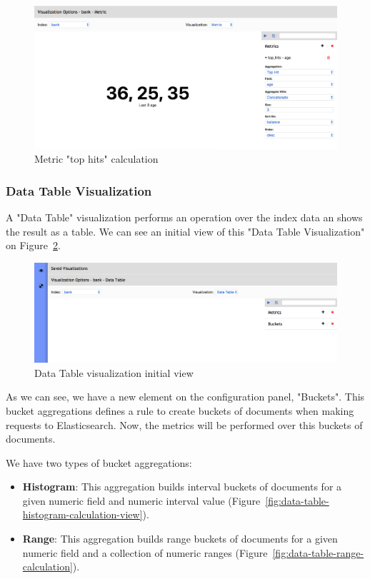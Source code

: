 \documentclass[a4paper, 12pt, english]{book}
\begin{document}
\begin{figure}
  \centering
  \includegraphics[width=13cm, keepaspectratio]{img/metric-top-calculation.png}
  \caption{Metric "top hits" calculation}
  \label{fig:metric-top-calcuation}
\end{figure}

\subsubsection{Data Table Visualization}
\label{sec:data-table-visualization}
A "Data Table" visualization performs an operation over the index data an shows the result as a table. We can see an initial view of this "Data Table Visualization" on Figure~\ref{fig:data-table-initial-view}.
\begin{figure}
  \centering
  \includegraphics[width=13cm, keepaspectratio]{img/data-table-initial-view.png}
  \caption{Data Table visualization initial view}
  \label{fig:data-table-initial-view}
\end{figure}

As we can see, we have a new element on the configuration panel, "Buckets". This bucket aggregations defines a rule to create buckets of documents when making requests to Elasticsearch. Now, the metrics will be performed over this buckets of documents.

We have two types of bucket aggregations:
\begin{itemize}
    \item \textbf{Histogram}: This aggregation builds interval buckets of documents for a given numeric field and numeric interval value (Figure~\ref{fig:data-table-histogram-calculation-view}).
    \item \textbf{Range}: This aggregation builds range buckets of documents for a given numeric field and a collection of numeric ranges (Figure~\ref{fig:data-table-range-calculation}).
\end{itemize}
\end{document}
